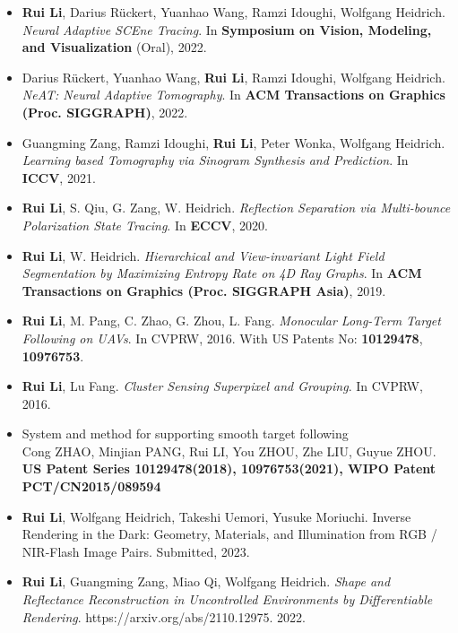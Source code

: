 \begin{itemize}
	\item \textbf{Rui Li}, Darius Rückert, Yuanhao Wang, Ramzi Idoughi, Wolfgang Heidrich. 
	\textit{Neural Adaptive SCEne Tracing}. In \textbf{Symposium on Vision, Modeling, and Visualization} (Oral), 2022. 
	\item Darius Rückert, Yuanhao Wang, \textbf{Rui Li}, Ramzi Idoughi, Wolfgang Heidrich. \textit{NeAT: Neural Adaptive Tomography}. In \textbf{ACM Transactions on Graphics (Proc. SIGGRAPH)},  2022. 
	\item Guangming Zang, Ramzi Idoughi, \textbf{Rui Li}, Peter Wonka, Wolfgang Heidrich. \textit{Learning based Tomography via Sinogram Synthesis and Prediction}. In \textbf{ICCV}, 2021. 
	\item \textbf{Rui Li}, S. Qiu, G. Zang, W. Heidrich. \textit{Reflection Separation via Multi-bounce Polarization State Tracing}. In \textbf{ECCV}, 2020. 
	\item \textbf{Rui Li}, W. Heidrich. \textit{Hierarchical and View-invariant Light Field Segmentation by Maximizing Entropy Rate on 4D Ray Graphs}. In \textbf{ACM Transactions on Graphics (Proc. SIGGRAPH Asia)}, 2019. 
	\item \textbf{Rui Li}, M. Pang, C. Zhao, G. Zhou, L. Fang. \textit{Monocular Long-Term Target Following on UAVs}. In CVPRW, 2016. With US Patents No: \textbf{10129478}, \textbf{10976753}.
	\item \textbf{Rui Li}, Lu Fang. \textit{Cluster Sensing Superpixel and Grouping}. In CVPRW, 2016. 
\end{itemize}

\begin{itemize}
	\item  System and method for supporting smooth target following\\ 
	Cong ZHAO, Minjian PANG, Rui LI, You ZHOU, Zhe LIU, Guyue ZHOU. \\
	\textbf{US Patent Series 10129478(2018), 10976753(2021),
		WIPO Patent PCT/CN2015/089594}
\end{itemize}

\begin{itemize}
	\item \textbf{Rui Li}, Wolfgang Heidrich, Takeshi Uemori, Yusuke Moriuchi. Inverse Rendering in the Dark: Geometry, Materials, and Illumination from RGB / NIR-Flash Image Pairs. Submitted, 2023. 
	\item \textbf{Rui Li}, Guangming Zang, Miao Qi, Wolfgang Heidrich. \textit{Shape and Reflectance Reconstruction in Uncontrolled Environments by Differentiable Rendering}. https://arxiv.org/abs/2110.12975. 2022. 
\end{itemize}





